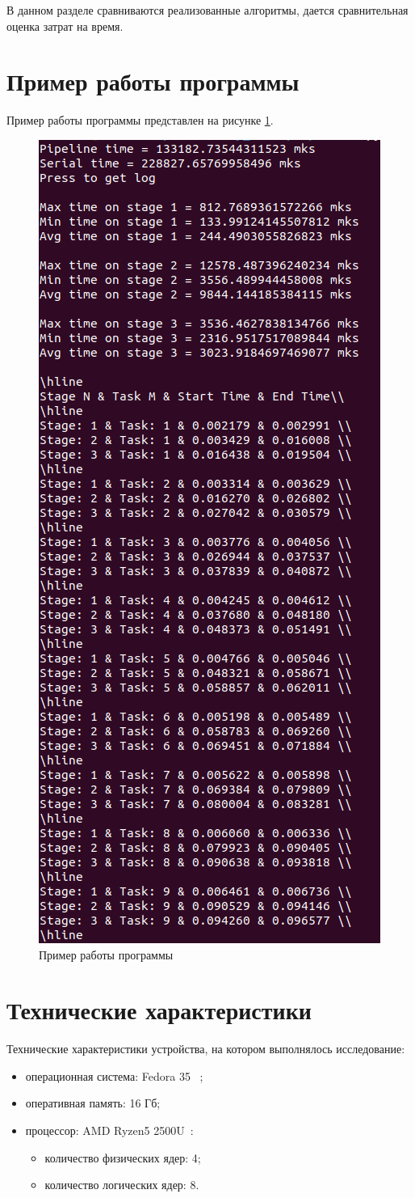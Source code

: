 \documentclass[../report.tex]{subfiles}
\begin{document}
В данном разделе сравниваются реализованные алгоритмы, дается сравнительная оценка затрат на время.

\section{Пример работы программы}
Пример работы программы представлен на рисунке \ref{fig:ex}.
\captionsetup{singlelinecheck=true}
\begin{figure}[H]
	\centering
	\includegraphics[width=0.62\linewidth]{images/example}
	\caption{Пример работы программы}
	\label{fig:ex}
\end{figure}

\section{Технические характеристики}
Технические характеристики устройства, на котором выполнялось исследование:
\begin{itemize}
	\item операционная система: Fedora 35 ~\cite{os};
	\item оперативная память: 16 Гб;
	\item процессор: AMD Ryzen5 2500U~\cite{processor}:
	\begin{itemize}
		\item количество физических ядер: 4;
		\item количество логических ядер: 8.
	\end{itemize}
\end{itemize}
\end{document}
